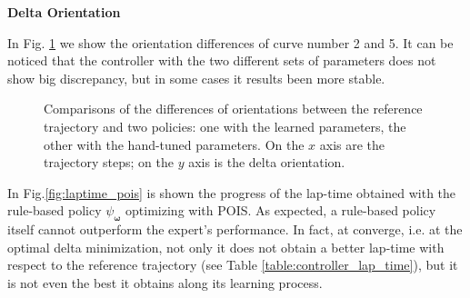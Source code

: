 \textbf{Delta Orientation}

In Fig. \ref{fig:deltaorien} we show the orientation differences of curve number 2 and 5. It can be noticed that the controller with the two different sets of parameters does not show big discrepancy, but in some cases it results been more stable.

\begin{figure}[H]
\centering
{}
\hspace{3mm}
\caption{Comparisons of the differences of orientations between the reference trajectory and two policies: one with the learned parameters, the other with the hand-tuned parameters. On the $x$ axis are the trajectory steps; on the $y$ axis is the delta orientation.}
\label{fig:deltaorien}
\end{figure}


In Fig.\ref{fig:laptime_pois} is shown the progress of the lap-time obtained with the rule-based policy $\psi_{\boldsymbol \omega}$ optimizing with POIS.
As expected, a rule-based policy itself cannot outperform the expert's performance. In fact, at converge, i.e. at the optimal delta minimization, not only it does not obtain a better lap-time with respect to the reference trajectory (see Table \ref{table:controller_lap_time}), but it is not even the best it obtains along its learning process.


